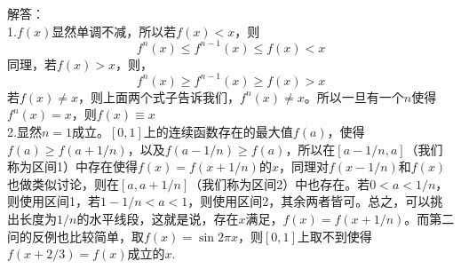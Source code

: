 \documentclass[11pt,a4paper,openany]{article}
\begin{document}
解答：\\
1.$f(x)$显然单调不减，所以若$f(x)<x$，则
\[
f^n(x)\le f^{n-1}(x) \le f(x)<x
\]
同理，若$f(x)>x$，则，
\[
f^n(x)\ge f^{n-1}(x) \ge f(x)>x
\]
若$f(x)\neq x$，则上面两个式子告诉我们，$f^n(x)\neq x$。所以一旦有一个$n$使得$f^n(x)=x$，则$f(x)\equiv x$\\
2.显然$n=1$成立。$[0,1]$上的连续函数存在的最大值$f(a)$，使得$f(a)\ge f(a+1/n)$，以及$f(a-1/n)\ge f(a)$，所以在$[a-1/n,a]$（我们称为区间1）中存在使得$f(x)= f(x+1/n)$的$x$，同理对$f(x-1/n)$和$f(x)$也做类似讨论，则在$[a,a+1/n]$（我们称为区间2）中也存在。若$0<a<1/n$，则使用区间1，若$1-1/n<a<1$，则使用区间2，其余两者皆可。总之，可以挑出长度为$1/n$的水平线段，这就是说，存在$x$满足，$f(x)= f(x+1/n)$。而第二问的反例也比较简单，取$f(x)=\sin{2\pi x}$，则$[0,1]$上取不到使得$f(x+2/3)=f(x)$成立的$x$.
\end{document}
